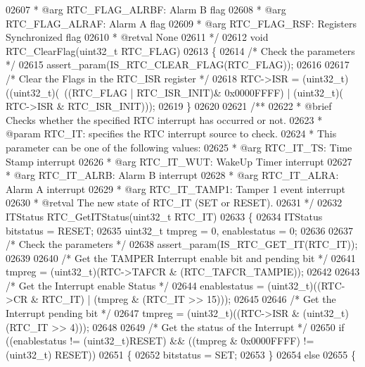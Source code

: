 \begin{DoxyCode}
02607 \textcolor{comment}{  *            @arg RTC\_FLAG\_ALRBF: Alarm B flag}
02608 \textcolor{comment}{  *            @arg RTC\_FLAG\_ALRAF: Alarm A flag}
02609 \textcolor{comment}{  *            @arg RTC\_FLAG\_RSF: Registers Synchronized flag}
02610 \textcolor{comment}{  * @retval None}
02611 \textcolor{comment}{  */}
02612 \textcolor{keywordtype}{void} RTC_ClearFlag(uint32\_t RTC\_FLAG)
02613 \{
02614   \textcolor{comment}{/* Check the parameters */}
02615   assert_param(IS\_RTC\_CLEAR\_FLAG(RTC\_FLAG));
02616 
02617   \textcolor{comment}{/* Clear the Flags in the RTC\_ISR register */}
02618   RTC->ISR = (uint32\_t)((uint32\_t)(~((RTC\_FLAG | RTC_ISR_INIT)& 0x0000FFFF) | (uint32\_t)(
      RTC->ISR & RTC_ISR_INIT)));
02619 \}
02620 
02621 \textcolor{comment}{/**}
02622 \textcolor{comment}{  * @brief  Checks whether the specified RTC interrupt has occurred or not.}
02623 \textcolor{comment}{  * @param  RTC\_IT: specifies the RTC interrupt source to check.}
02624 \textcolor{comment}{  *          This parameter can be one of the following values:}
02625 \textcolor{comment}{  *            @arg RTC\_IT\_TS: Time Stamp interrupt }
02626 \textcolor{comment}{  *            @arg RTC\_IT\_WUT: WakeUp Timer interrupt }
02627 \textcolor{comment}{  *            @arg RTC\_IT\_ALRB: Alarm B interrupt }
02628 \textcolor{comment}{  *            @arg RTC\_IT\_ALRA: Alarm A interrupt }
02629 \textcolor{comment}{  *            @arg RTC\_IT\_TAMP1: Tamper 1 event interrupt }
02630 \textcolor{comment}{  * @retval The new state of RTC\_IT (SET or RESET).}
02631 \textcolor{comment}{  */}
02632 ITStatus RTC_GetITStatus(uint32\_t RTC\_IT)
02633 \{
02634   ITStatus bitstatus = RESET;
02635   uint32\_t tmpreg = 0, enablestatus = 0;
02636 
02637   \textcolor{comment}{/* Check the parameters */}
02638   assert_param(IS\_RTC\_GET\_IT(RTC\_IT));
02639 
02640   \textcolor{comment}{/* Get the TAMPER Interrupt enable bit and pending bit */}
02641   tmpreg = (uint32\_t)(RTC->TAFCR & (RTC_TAFCR_TAMPIE));
02642 
02643   \textcolor{comment}{/* Get the Interrupt enable Status */}
02644   enablestatus = (uint32\_t)((RTC->CR & RTC\_IT) | (tmpreg & (RTC\_IT >> 15)));
02645 
02646   \textcolor{comment}{/* Get the Interrupt pending bit */}
02647   tmpreg = (uint32\_t)((RTC->ISR & (uint32\_t)(RTC\_IT >> 4)));
02648 
02649   \textcolor{comment}{/* Get the status of the Interrupt */}
02650   \textcolor{keywordflow}{if} ((enablestatus != (uint32\_t)RESET) && ((tmpreg & 0x0000FFFF) != (uint32\_t)
      RESET))
02651   \{
02652     bitstatus = SET;
02653   \}
02654   \textcolor{keywordflow}{else}
02655   \{

\end{DoxyCode}
